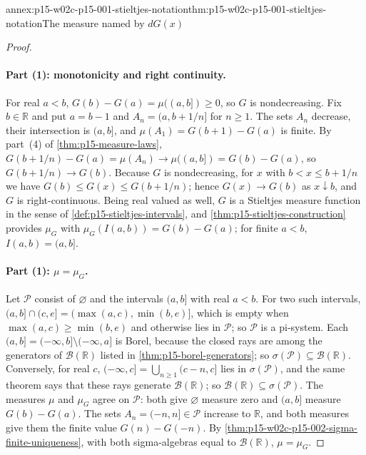 \begin{annexitem}{annex:p15-w02c-p15-001-stieltjes-notation}{thm:p15-w02c-p15-001-stieltjes-notation}{The measure named by \(dG(x)\)}
\begin{proof}
\paragraph{Part (1): monotonicity and right continuity.}
For real \(a<b\), \(G(b)-G(a)=\mu((a,b])\geq0\), so \(G\) is
nondecreasing. Fix \(b\in\mathbb R\) and put \(a=b-1\) and
\(A_n=(a,b+1/n]\) for \(n\geq1\). The sets \(A_n\) decrease, their
intersection is \((a,b]\), and \(\mu(A_1)=G(b+1)-G(a)\) is finite. By
part~(4) of \cref{thm:p15-measure-laws},
\(G(b+1/n)-G(a)=\mu(A_n)\to\mu((a,b])=G(b)-G(a)\), so
\(G(b+1/n)\to G(b)\). Because \(G\) is nondecreasing, for \(x\) with
\(b<x\leq b+1/n\) we have \(G(b)\leq G(x)\leq G(b+1/n)\); hence
\(G(x)\to G(b)\) as \(x\downarrow b\), and \(G\) is right-continuous.
Being real valued as well, \(G\) is a Stieltjes measure function in the
sense of \cref{def:p15-stieltjes-intervals}, and
\cref{thm:p15-stieltjes-construction} provides \(\mu_G\) with
\(\mu_G(I(a,b))=G(b)-G(a)\); for finite \(a<b\),
\(I(a,b)=(a,b]\).

\paragraph{Part (1): \(\mu=\mu_G\).}
Let \(\mathcal P\) consist of \(\varnothing\) and the intervals
\((a,b]\) with real \(a<b\). For two such intervals,
\((a,b]\cap(c,e]=(\max(a,c),\min(b,e)]\), which is empty when
\(\max(a,c)\geq\min(b,e)\) and otherwise lies in \(\mathcal P\); so
\(\mathcal P\) is a pi-system. Each \((a,b]=(-\infty,b]\setminus(-\infty,a]\)
is Borel, because the closed rays are among the generators of
\(\mathcal B(\mathbb R)\) listed in \cref{thm:p15-borel-generators}; so
\(\sigma(\mathcal P)\subseteq\mathcal B(\mathbb R)\). Conversely, for real
\(c\), \((-\infty,c]=\bigcup_{n\geq1}(c-n,c]\) lies in
\(\sigma(\mathcal P)\), and the same theorem says that these rays generate
\(\mathcal B(\mathbb R)\); so \(\mathcal B(\mathbb R)\subseteq\sigma(\mathcal P)\).
The measures \(\mu\) and \(\mu_G\) agree on \(\mathcal P\): both give
\(\varnothing\) measure zero and \((a,b]\) measure \(G(b)-G(a)\). The sets
\(A_n=(-n,n]\in\mathcal P\) increase to \(\mathbb R\), and both measures
give them the finite value \(G(n)-G(-n)\). By
\cref{thm:p15-w02c-p15-002-sigma-finite-uniqueness}, with both
sigma-algebras equal to \(\mathcal B(\mathbb R)\), \(\mu=\mu_G\).


\end{proof}
\end{annexitem}
